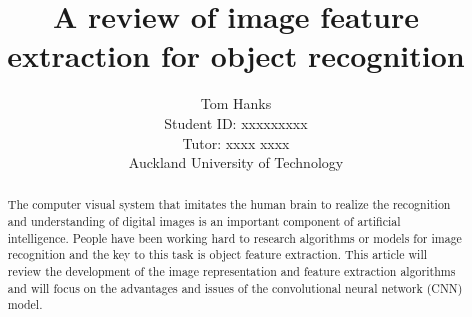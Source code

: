 \documentclass[10pt, a4paper]{article}
\title{A review of image feature extraction for object recognition}
\date{}
\author{Tom Hanks \\ Student ID: xxxxxxxxx \\Tutor: xxxx xxxx\\Auckland University of Technology}
\begin{document}
	\maketitle
 	
	\begin{multicols}{2}
	\begin{abstract} \justify %
	The computer visual system that imitates the human brain to realize the recognition and understanding of digital images is an important component of artificial intelligence. People have been working hard to research algorithms or models for image recognition and the key to this task is object feature extraction. This article will review the development of the image representation and feature extraction algorithms and will focus on the advantages and issues of the convolutional neural network (CNN) model.
	\end{abstract}


	\setlength{\lineskip}{3em}     	%
	\setlength{\parskip}{0.5em}     %

\end{multicols}
\end{document}
